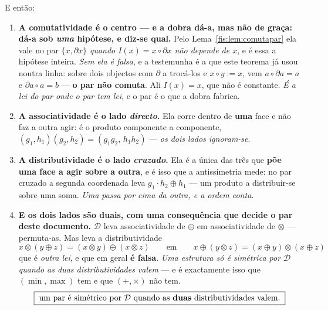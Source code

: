 \documentclass[livro.tex]{subfiles}
\begin{document}
\begin{teorema}
\medskip\noindent E então:
\begin{enumerate}\itemsep3pt
\item[(1)] \textbf{A comutatividade é o centro --- e a dobra dá-a, mas não de
graça: dá-a sob \emph{uma} hipótese, e diz-se qual.} Pelo
Lema~\ref{fis:lem:comutapar} ela vale no par $\{x,\partial x\}$ \emph{quando
$I(x)=x\circ\partial x$ não depende de $x$}, e é essa a hipótese inteira.
\emph{Sem ela é falsa}, e a testemunha é a que este teorema já usou noutra
linha: sobre dois objectos com $\partial$ a trocá-los e $x\circ y:=x$, vem
$a\circ\partial a=a$ e $\partial a\circ a=b$ --- \textbf{o par não comuta}. Ali
$I(x)=x$, que não é constante. \emph{É a lei do par onde o par tem lei}, e o par
é o que a dobra fabrica.
\item[(2)] \textbf{A associatividade é o lado \emph{directo}.} Ela corre dentro
de \textbf{uma} face e não faz a outra agir: é o produto componente a componente,
$(g_1,h_1)(g_2,h_2)=(g_1g_2,\,h_1h_2)$ --- \emph{os dois lados ignoram-se}.
\item[(3)] \textbf{A distributividade é o lado \emph{cruzado}.} Ela é a única das
três que \textbf{põe uma face a agir sobre a outra}, e é isso que a antissimetria
mede: no par cruzado a segunda coordenada leva $g_1\!\cdot\! h_2\oplus h_1$ ---
um produto a distribuir-se sobre uma soma. \emph{Uma passa por cima da outra, e a
ordem conta.}
\item[(4)] \textbf{E os dois lados são duais, com uma consequência que decide o
par deste documento.} $\mathcal{D}$ leva associatividade de $\oplus$ em
associatividade de $\otimes$ --- permuta-as. Mas leva a distributividade
\[
x\otimes(y\oplus z)=(x\otimes y)\oplus(x\otimes z)
\qquad\text{em}\qquad
x\oplus(y\otimes z)=(x\oplus y)\otimes(x\oplus z)
\]
que é \emph{outra lei}, e que em geral \textbf{é falsa}. \emph{Uma estrutura só é
simétrica por $\mathcal{D}$ quando as duas distributividades valem} --- e é
exactamente isso que $(\min,\max)$ tem e que $(+,\times)$ não tem.
\[
\boxed{\;\text{um par é simétrico por }\mathcal{D}\text{ quando as \textbf{duas} distributividades valem.}\;}
\]
\end{enumerate}
\end{teorema}
\end{document}
